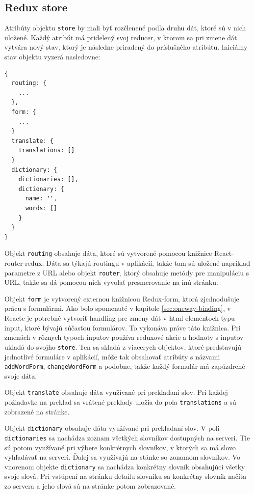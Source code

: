 \documentclass[
  digital, %
  table,   %
  lof,     %
  lot,     %
]{fithesis3}
\begin{document}
\subsection{Redux store}
Atribúty objektu \texttt{store} by mali byť rozčlenené podľa druhu dát, ktoré sú v nich uložené. Každý atribút má pridelený svoj reducer, v ktorom sa pri zmene dát vytvára nový stav, ktorý je následne priradený do príslušného atribútu. Iniciálny stav objektu vyzerá nasledovne:

\begin{lstlisting}[basicstyle=\small]
{
  routing: {
    ...
  },
  form: {
    ...
  }
  translate: {
    translations: []
  }
  dictionary: {
    dictionaries: [],
    dictionary: {
      name: '',
      words: []
    }
  }
}
\end{lstlisting}

Objekt \texttt{routing} obsahuje dáta, ktoré sú vytvorené pomocou knižnice React-router-redux. Dáta sa týkajú routingu v aplikácií, takže tam sú uložené napríklad parametre z URL alebo objekt \texttt{router}, ktorý obsahuje metódy pre manipuláciu s URL, takže sa dá pomocou nich vyvolať presmerovanie na inú stránku.

Objekt \texttt{form} je vytvorený externou knižnicou Redux-form, ktorá zjednodušuje prácu s formulármi. Ako bolo spomenuté v kapitole \ref{sec:oneway-binding}, v Reacte je potrebné vytvoriť handling pre zmeny dát v html elementoch typu input, ktoré bývajú súčasťou formulárov. To vykonáva práve táto knižnica. Pri zmenách v rôznych typoch inputov používa reduxové akcie a hodnoty s inputov ukladá do svojho \texttt{store}. Ten sa skladá z viacerych objektov, ktoré predstavujú jednotlivé formuláre v aplikácií, môže tak obsahovať atribúty s názvami \texttt{addWordForm}, \texttt{changeWordForm} a podobne, takže každý formulár má zapúzdrené svoje dáta.

Objekt \texttt{translate} obsahuje dáta využívané pri prekladaní slov. Pri každej požiadavke na preklad sa vrátené preklady uložia do pola \texttt{translations} a sú zobrazené na stránke.

Objekt \texttt{dictionary} obsahuje dáta využívané pri prekladaní slov. V poli \texttt{dictionaries} sa nachádza zoznam všetkých slovníkov dostupných na serveri. Tie sú potom využívané pri výbere konkrétnych slovníkov, v ktorých sa má slovo vyhľadávať na serveri. Ďalej sa využívajú na stánke so zonamom slovníkov. Vo vnorenom objekte \texttt{dictionary} sa nachádza konkrétny slovník obsahujúci všetky svoje slová. Pri vstúpení na stránku detailu slovníku sa konkrétny slovník načíta zo servera a jeho slová sú na stránke potom zobrazované.
\end{document}
